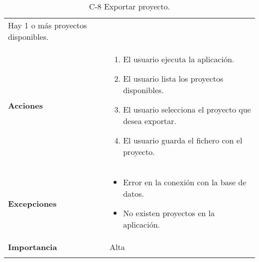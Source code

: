 \begin{longtable}[H]{@{}ll@{}}
\begin{minipage}[t]{0.71\columnwidth}
Hay 1 o más proyectos disponibles.
\strut
\end{minipage}\tabularnewline
\begin{minipage}[t]{0.23\columnwidth}\raggedright\strut
\textbf{Acciones}\strut
\end{minipage} & \begin{minipage}[t]{0.71\columnwidth}\raggedright\strut
\begin{enumerate}
\def\labelenumi{\arabic{enumi}.}
\item
El usuario ejecuta la aplicación.
\item
El usuario lista los proyectos disponibles.
\item
El usuario selecciona el proyecto que desea exportar.
\item
El usuario guarda el fichero con el proyecto.
\end{enumerate}\strut
\end{minipage}\tabularnewline
\begin{minipage}[t]{0.23\columnwidth}\raggedright\strut
\textbf{Excepciones}\strut
\end{minipage} & \begin{minipage}[t]{0.71\columnwidth}\raggedright\strut
\begin{itemize}
\item
Error en la conexión con la base de datos.
\item
No existen proyectos en la aplicación.
\end{itemize}\strut
\end{minipage}\tabularnewline
\begin{minipage}[t]{0.23\columnwidth}\raggedright\strut
\textbf{Importancia}\strut
\end{minipage} & \begin{minipage}[t]{0.71\columnwidth}\raggedright\strut
Alta\strut
\end{minipage}\tabularnewline
\bottomrule
\caption{C-8 Exportar proyecto.}
\end{longtable}


